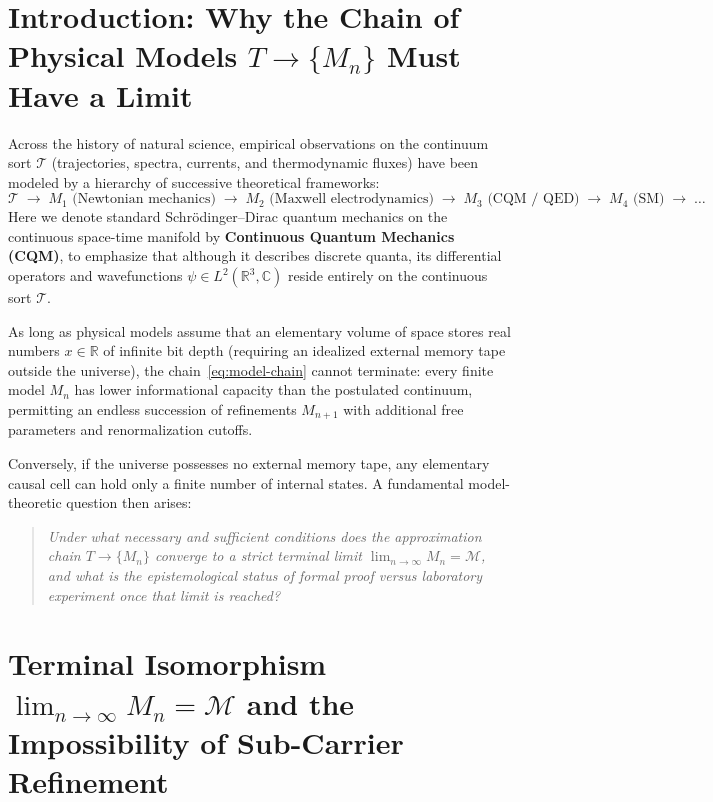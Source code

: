 \documentclass[11pt,a4paper]{article}
\theoremstyle{definition}
\theoremstyle{remark}
\begin{document}
\section{Introduction: Why the Chain of Physical Models $T \to \{M_n\}$ Must Have a Limit}
\label{sec:intro}

Across the history of natural science, empirical observations on the continuum sort $\mathcal{T}$ (trajectories, spectra, currents, and thermodynamic fluxes) have been modeled by a hierarchy of successive theoretical frameworks:
\begin{equation}
  \label{eq:model-chain}
  \mathcal{T} \;\longrightarrow\; M_1 \text{ (Newtonian mechanics)} \;\longrightarrow\; M_2 \text{ (Maxwell electrodynamics)} \;\longrightarrow\; M_3 \text{ (CQM / QED)} \;\longrightarrow\; M_4 \text{ (SM)} \;\longrightarrow\; \dots
\end{equation}
Here we denote standard Schrödinger--Dirac quantum mechanics on the continuous space-time manifold by \textbf{Continuous Quantum Mechanics (CQM)}, to emphasize that although it describes discrete quanta, its differential operators and wavefunctions $\psi\in L^2(\mathbb{R}^3,\mathbb{C})$ reside entirely on the continuous sort $\mathcal{T}$.

As long as physical models assume that an elementary volume of space stores real numbers $x\in\mathbb{R}$ of infinite bit depth (requiring an idealized external memory tape outside the universe), the chain~\eqref{eq:model-chain} cannot terminate: every finite model $M_n$ has lower informational capacity than the postulated continuum, permitting an endless succession of refinements $M_{n+1}$ with additional free parameters and renormalization cutoffs.

Conversely, if the universe possesses no external memory tape, any elementary causal cell can hold only a finite number of internal states. A fundamental model-theoretic question then arises:
\begin{quote}
  \emph{Under what necessary and sufficient conditions does the approximation chain $T \to \{M_n\}$ converge to a strict terminal limit $\lim_{n\to\infty} M_n = \mathcal{M}$, and what is the epistemological status of formal proof versus laboratory experiment once that limit is reached?}
\end{quote}

\section{Terminal Isomorphism $\lim_{n\to\infty} M_n = \mathcal{M}$ and the Impossibility of Sub-Carrier Refinement}
\label{sec:terminal-limit}
\end{document}
